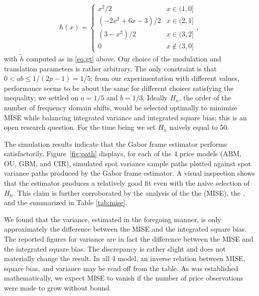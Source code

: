 \begin{align}
  h(x) = \left\{
    \begin{array}{lr}
    x^2/2 & x \in (1,0]\\
  (-2x^2 + 6x - 3)/2 & x \in (2,1]\\
(3-x^2)/2 & x \in (3,2]\\
0 & x \not\in (3,0]
\end{array}\right. ,
  \label{eq:theh}
\end{align}
with  $\tilde{h}$ computed as in \eqref{eq:gt} above.
Our choice of the modulation and translation parameters is rather arbitrary. The only constraint is that $0 < ab \le 1/(2p -1) = 1/5$; from our experimentation with different values, performance seems to be about the same for different choices satisfying the inequality;  we settled on $a = 1/5$ and $b = 1/3$.  Ideally $H_n$, the order of the number of frequency domain shifts, would be selected optimally to minimize MISE while balancing integrated variance and integrated square  bias; this is an open research question. For the time being we  set $H_n$ naively equal to 50.

The simulation results indicate that the Gabor frame estimator performs satisfactorily. Figure~\ref{fig:path} displays, for each of the 4 price models (ABM, OU, GBM, and CIR), simulated  spot variance sample paths plotted against spot variance paths produced by the Gabor frame estimator.  A visual inspection shows that the estimator produces a relatively good fit even with the naive selection of $H_n$. This claim is further corroborated by the analysis of the the \mise (MISE), the \isqb, and the \ivar summarized in Table \ref{tab:mise}.\begin{comment} 
The figures in the table are arrived at in the following manner: first,  100 price histories are simulated for each observation frequency and  model pair.  So, each history is the result of sampling $n$ price observations from  distribution $F$, where $n$ is the specified observation frequency and $F$ is the distribution implied by the stochastic differential equation. The resulting data is a matrix with 100 rows and $n$ columns.  Each row represents a price history from which integrated quatities may be obatined, and each column indexes an orbservation time. Going down a column, average quantities may be computed. 
For instance, to arrive at the integrated square bias figures, average spot variances were computed for each observation times; the figures were then squared, weighted by $\Delta_n$, and summed up. The integrated mean square error is computed similarly. \end{comment}
 We found that the variance, estimated in the foregoing manner,  is only approximately the difference between the MISE and the integrated square bias.  The reported figures for variance are  in fact the difference between the MISE and the integrated square bias. The discrepancy is rather slight and does not materially change the result. In all 4 model, an inverse relation between MISE, square bias, and variance may be read off from the table. As was established mathematically, we expect MISE to vanish if the number of price observations were made to grow without bound.    
